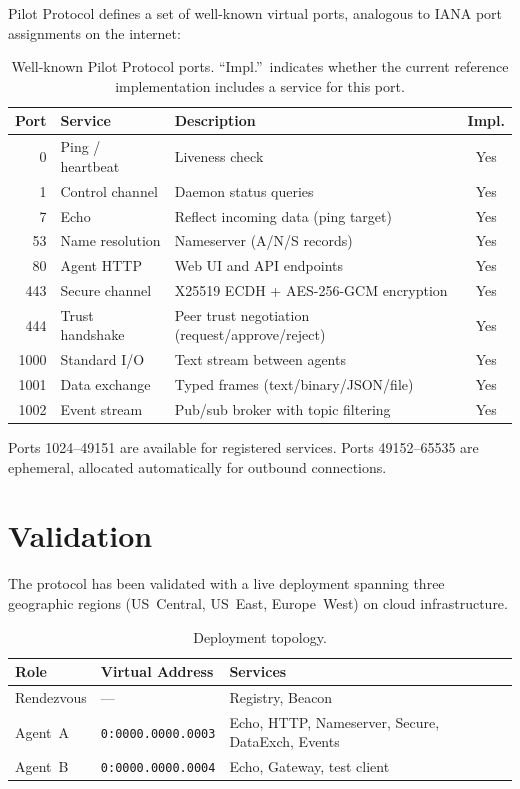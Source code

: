 \documentclass[11pt,a4paper]{article}
\begin{document}
Pilot Protocol defines a set of well-known virtual ports, analogous to IANA port assignments on the internet:

\begin{table}[h]
\centering
\begin{tabular}{@{}rllc@{}}
\toprule
\textbf{Port} & \textbf{Service} & \textbf{Description} & \textbf{Impl.} \\
\midrule
0    & Ping / heartbeat     & Liveness check                        & Yes \\
1    & Control channel      & Daemon status queries                 & Yes \\
7    & Echo                 & Reflect incoming data (ping target)   & Yes \\
53   & Name resolution      & Nameserver (A/N/S records)            & Yes \\
80   & Agent HTTP           & Web UI and API endpoints              & Yes \\
443  & Secure channel       & X25519 ECDH + AES-256-GCM encryption & Yes \\
444  & Trust handshake      & Peer trust negotiation (request/approve/reject) & Yes \\
1000 & Standard I/O         & Text stream between agents            & Yes \\
1001 & Data exchange        & Typed frames (text/binary/JSON/file)  & Yes \\
1002 & Event stream         & Pub/sub broker with topic filtering   & Yes \\
\bottomrule
\end{tabular}
\caption{Well-known Pilot Protocol ports. ``Impl.''\ indicates whether the current reference implementation includes a service for this port.}
\label{tab:ports}
\end{table}

Ports 1024--49151 are available for registered services. Ports 49152--65535 are ephemeral, allocated automatically for outbound connections.

\section{Validation}

The protocol has been validated with a live deployment spanning three geographic regions (US~Central, US~East, Europe~West) on cloud infrastructure.

\begin{table}[h]
\centering
\begin{tabular}{@{}lll@{}}
\toprule
\textbf{Role} & \textbf{Virtual Address} & \textbf{Services} \\
\midrule
Rendezvous & ---                         & Registry, Beacon \\
Agent~A    & \texttt{0:0000.0000.0003}   & Echo, HTTP, Nameserver, Secure, DataExch, Events \\
Agent~B    & \texttt{0:0000.0000.0004}   & Echo, Gateway, test client \\
\bottomrule
\end{tabular}
\caption{Deployment topology.}
\label{fig:deployment}
\end{table}
\end{document}
